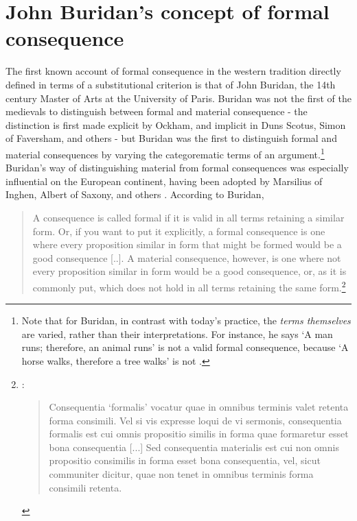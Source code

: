 \documentclass[]{article}
\begin{document}
	\section{John Buridan's concept of formal consequence}
	The first known account of formal consequence in the western tradition directly defined in terms of a substitutional criterion is that of John Buridan, the 14th century Master of Arts at the University of Paris. Buridan was not the first of the medievals to distinguish between formal and material consequence - the distinction is first made explicit by Ockham, and implicit in Duns Scotus, Simon of Faversham, and others - but Buridan was the first to distinguish formal and material consequences by varying the categorematic terms of an argument.\footnote{Note that for Buridan, in contrast with today's practice, the \textit{terms themselves} are varied, rather than their interpretations. For instance, he says `A man runs; therefore, an animal runs' is not a valid formal consequence, because `A horse walks, therefore a tree walks' is not \cite[TC 1.4.3]{Buridan2015}.} Buridan's way of distinguishing material from formal consequences was especially influential on the European continent, having been adopted by Marsilius of Inghen, Albert of Saxony, and others \cite{DutilhNovaes2012a}. According to Buridan, 
	
	\begin{quote}
		A consequence is called formal if it is valid in all terms retaining a similar form. Or, if you want to put it explicitly, a formal consequence is one where every proposition similar in form that might be formed would be a good consequence [..]. A material consequence, however, is one where not every proposition similar in form would be a good consequence, or, as it is commonly put, which does not hold in all terms retaining the same form.\footnote{\cite[I.4, p. 68]{Buridan2015}: 
			
			\begin{quote}
				Consequentia `formalis' vocatur quae in omnibus terminis valet retenta forma consimili. Vel si vis expresse loqui de vi sermonis, consequentia formalis est cui omnis propositio similis in forma quae formaretur esset bona consequentia [...] Sed consequentia materialis est cui non omnis propositio consimilis in forma esset bona consequentia, vel, sicut communiter dicitur, quae non tenet in omnibus terminis forma consimili retenta.
			\end{quote}}
			
		\end{quote}
		
\end{document}
